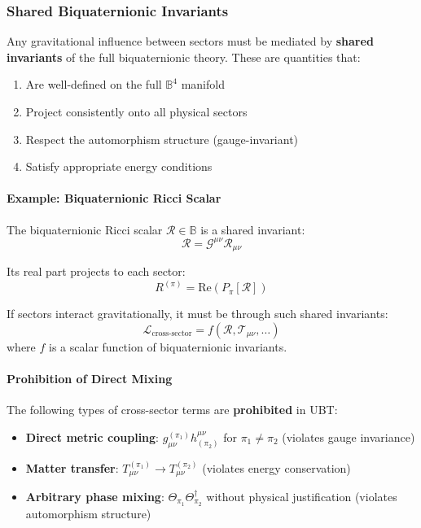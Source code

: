 \subsubsection{Shared Biquaternionic Invariants}

Any gravitational influence between sectors must be mediated by \textbf{shared invariants} of the full biquaternionic theory. These are quantities that:
\begin{enumerate}
\item Are well-defined on the full $\mathbb{B}^4$ manifold
\item Project consistently onto all physical sectors
\item Respect the automorphism structure (gauge-invariant)
\item Satisfy appropriate energy conditions
\end{enumerate}

\paragraph{Example: Biquaternionic Ricci Scalar}

The biquaternionic Ricci scalar $\mathcal{R} \in \mathbb{B}$ is a shared invariant:
\begin{equation}
\mathcal{R} = \mathcal{G}^{\mu\nu} \mathcal{R}_{\mu\nu}
\end{equation}

Its real part projects to each sector:
\begin{equation}
R^{(\pi)} = \text{Re}(P_\pi[\mathcal{R}])
\end{equation}

If sectors interact gravitationally, it must be through such shared invariants:
\begin{equation}
\boxed{\mathcal{L}_{\text{cross-sector}} = f(\mathcal{R}, \mathcal{T}_{\mu\nu}, \ldots)}
\end{equation}
where $f$ is a scalar function of biquaternionic invariants.

\paragraph{Prohibition of Direct Mixing}

The following types of cross-sector terms are \textbf{prohibited} in UBT:
\begin{itemize}
\item \textbf{Direct metric coupling}: $g_{\mu\nu}^{(\pi_1)} h^{\mu\nu}_{(\pi_2)}$ for $\pi_1 \neq \pi_2$ (violates gauge invariance)
\item \textbf{Matter transfer}: $T_{\mu\nu}^{(\pi_1)} \to T_{\mu\nu}^{(\pi_2)}$ (violates energy conservation)
\item \textbf{Arbitrary phase mixing}: $\Theta_{\pi_1} \Theta_{\pi_2}^\dagger$ without physical justification (violates automorphism structure)
\end{itemize}

